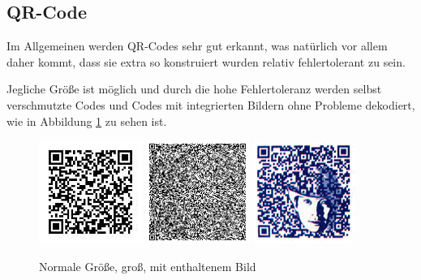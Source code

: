 \subsection*{QR-Code}
\writtenby{\dcauthornameriren}%
Im Allgemeinen werden QR-Codes sehr gut erkannt, was natürlich vor allem daher kommt, dass sie extra so konstruiert wurden relativ fehlertolerant zu sein.

Jegliche Größe ist möglich und durch die hohe Fehlertoleranz werden selbst verschmutzte Codes und Codes mit integrierten Bildern ohne Probleme dekodiert, wie in Abbildung \ref*{fig:qrnormal} zu sehen ist.

\begin{figure}[H]
  \centering
  \includegraphics[width=0.3\textwidth]{img/QR/perfect_03.jpg}
  \includegraphics[width=0.3\textwidth]{img/QR/perfect_02.png}
  \includegraphics[width=0.3\textwidth]{img/QR/perfect_04.jpg}
  \caption{Normale Größe, groß, mit enthaltenem Bild}
  \label{fig:qrnormal}
\end{figure}

